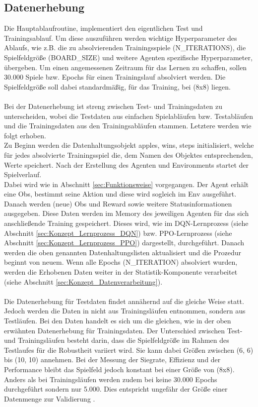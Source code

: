 \subsection{Datenerhebung} \label{sec:Konzept_Datenerhebung}
Die Hauptablaufroutine, implementiert den eigentlichen Test und Trainingsablauf.
Um diese auszuführen werden wichtige Hyperparameter des Ablaufs, wie z.B. die zu absolvierenden Trainingsspiele (N\_ITERATIONS), die Spielfeldgröße (BOARD\_SIZE) und weitere Agenten spezifische Hyperparameter, übergeben. Um einen angemessenen Zeitraum für das Lernen zu schaffen, sollen 30.000 Spiele bzw. Epochs für einen Trainingslauf absolviert werden. Die Spielfeldgröße soll dabei standardmäßig, für das Training, bei (8x8) liegen.\\
\\Bei der Datenerhebung ist streng zwischen Test- und Trainingsdaten zu unterscheiden, wobei die Testdaten aus einfachen Spielabläufen bzw. Testabläufen und die Trainingsdaten aus den Trainingsabläufen stammen. Letztere werden wie folgt erhoben.\\
Zu Beginn werden die Datenhaltungsobjekt apples, wins, steps initialisiert, welche für jedes absolvierte Trainingsspiel die, dem Namen des Objektes entsprechenden, Werte speichert. 
Nach der Erstellung des Agenten und Environments startet der Spielverlauf.\\
Dabei wird wie in Abschnitt \ref{sec:Funktionsweise} vorgegangen. Der Agent erhält eine Obs, bestimmt seine Aktion und diese wird sogleich im Env ausgeführt. Danach werden (neue) Obs und Reward sowie weitere Statusinformationen ausgegeben. Diese Daten werden im Memory des jeweiligen Agenten für das sich anschließende Training gespeichert. Dieses wird, wie im DQN-Lernprozess (siehe Abschnitt \ref{sec:Konzept_Lernprozess_DQN}) bzw. PPO-Lernprozess (siehe Abschnitt \ref{sec:Konzept_Lernprozess_PPO}) dargestellt, durchgeführt. 
Danach werden die oben genannten Datenhaltungslisten aktualisiert und die Prozedur beginnt von neuem. Wenn alle Epochs (N\_ITERATION) absolviert wurden, werden die Erhobenen Daten weiter in der Statistik-Komponente verarbeitet (siehe Abschnitt \ref{sec:Konzept_Datenverarbeitung}).\\
\\Die Datenerhebung für Testdaten findet annähernd auf die gleiche Weise statt. Jedoch werden die Daten in nicht aus Trainingsläufen entnommen, sondern aus Testläufen. Bei den Daten handelt es sich um die gleichen, wie in der oben erwähnten Datenerhebung für Trainingsdaten. Der Unterschied zwischen Test- und Trainingsläufen besteht darin, dass die Spielfeldgröße im Rahmen des Testlaufes für die Robustheit variiert wird. Sie kann dabei Größen zwischen (6, 6) bis (10, 10) annehmen. Bei der Messung der Siegrate, Effizienz und der Performance bleibt das Spielfeld jedoch konstant bei einer Größe von (8x8). Anders als bei Trainingsläufen werden zudem bei keine 30.000 Epochs durchgeführt sondern nur 5.000. Dies entspricht ungefähr der Größe einer Datenmenge zur Validierung \cite[S. 134]{DL}.\\
